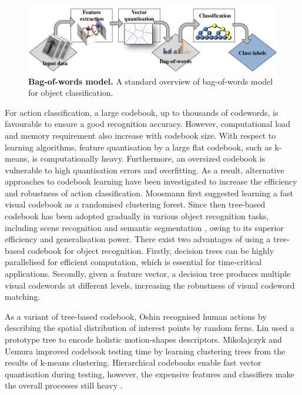 \begin{figure}[t]
	\centering  	
	\includegraphics[width=1\linewidth]{fig/act/bow.pdf}
	\caption{\textbf{Bag-of-words model.} A standard overview of bag-of-words model for object classification.}
	\label{fig/act/bow}
\end{figure}


For action classification, a large codebook, \eg up to thousands of codewords, is favourable to ensure a good recognition accuracy. However, computational load and memory requirement also increase with codebook size. With respect to learning algorithms, feature quantisation by a large flat codebook, such as k-means, is computationally heavy. Furthermore, an oversized codebook is vulnerable to high quantisation errors and overfitting. As a result, alternative approaches to codebook learning have been investigated to increase the efficiency and robustness of action classification. Moosmann \etal \cite{Moosmann2007} first suggested learning a fast visual codebook as a randomised clustering forest. Since then tree-based codebook has been adopted gradually in various object recognition tasks, including scene recognition \cite{Bosch2007} and semantic segmentation \cite{Shotton2008}, owing to its superior efficiency and generalisation power. There exist two advantages of using a tree-based codebook for object recognition. Firstly, decision trees can be highly parallelised for efficient computation, which is essential for time-critical applications. Secondly, given a feature vector, a decision tree produces multiple visual codewords at different levels, increasing the robustness of visual codeword matching. 

As a variant of tree-based codebook, Oshin \etal \cite{Oshin2009} recognised human actions by describing the spatial distribution of interest points by random ferns. Lin \etal \cite{Lin2009} used a prototype tree to encode holistic motion-shapes descriptors.  Mikolajczyk and Uemura \cite{Mikolajczyk2008} improved codebook testing time by learning clustering trees from the results of k-means clustering. Hierarchical codebooks enable fast vector quantisation during testing, however, the expensive features and classifiers make the overall processes still heavy \cite{Lin2009, Mikolajczyk2008}.


